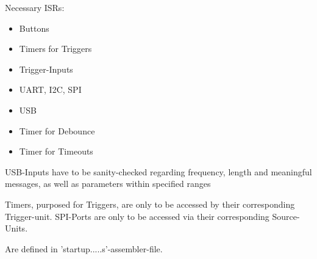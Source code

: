 	{	Necessary ISRs:
		\begin{itemize} \setlength\itemsep{1px}
		\item Buttons
		\item Timers for Triggers
		\item Trigger-Inputs
		\item UART, I2C, SPI
		\item USB
		\item Timer for Debounce
		\item Timer for Timeouts
		\end{itemize}
	}

	{	USB-Inputs have to be sanity-checked regarding frequency, length and meaningful messages, as well as parameters within specified ranges

	}

	{	Timers, purposed for Triggers, are only to be accessed by their corresponding Trigger-unit.
		SPI-Ports are only to be accessed via their corresponding Source-Units.
	}

	{	Are defined in 'startup.....s'-assembler-file.	}

